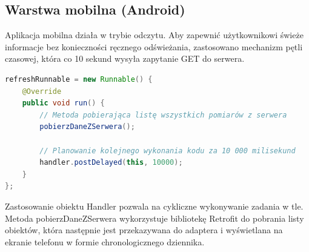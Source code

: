 \subsection{Warstwa mobilna (Android)}
Aplikacja mobilna działa w trybie odczytu. Aby zapewnić użytkownikowi świeże informacje bez konieczności ręcznego odświeżania, zastosowano mechanizm pętli czasowej, która co 10 sekund wysyła zapytanie GET do serwera.

\begin{lstlisting}[language=Java, caption={Fragment kodu odpowiedzialny za odbieranie danych}, label={lst:refreshRunnable}]
refreshRunnable = new Runnable() {
    @Override
    public void run() {
        // Metoda pobierająca listę wszystkich pomiarów z serwera
        pobierzDaneZSerwera();
        
        // Planowanie kolejnego wykonania kodu za 10 000 milisekund
        handler.postDelayed(this, 10000);
    }
};
\end{lstlisting}

Zastosowanie obiektu Handler pozwala na cykliczne wykonywanie zadania w tle. Metoda pobierzDaneZSerwera wykorzystuje bibliotekę Retrofit do pobrania listy obiektów, która następnie jest przekazywana do adaptera i wyświetlana na ekranie telefonu w formie chronologicznego dziennika.